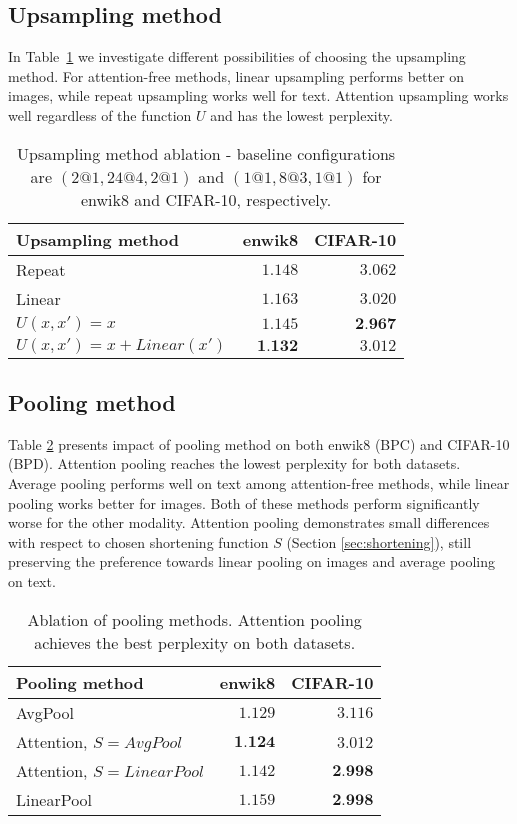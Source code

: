 \documentclass[11pt]{article}
\begin{document}
\subsection{Upsampling method}\label{sec:upsampling}
In Table~\ref{tab:upsampling} we investigate different possibilities of choosing the upsampling method. For attention-free methods, linear upsampling performs better on images, while repeat upsampling works well for text. Attention upsampling works well regardless of the function $U$ and has the lowest perplexity.

\begin{table}[ht!]
\small
\centering
\setlength{\tabcolsep}{0.9em}
\begin{tabular}{lrr}
\hline
Upsampling method & enwik8 & CIFAR-10 \\
\hline
Repeat & $1.148$ & $3.062$ \\ 
\hline
Linear & $1.163$ & $3.020$  \\
$U(x, x') = x$ & $1.145$ & $\textbf{2.967}$ \\
$U(x, x') = x + Linear(x')$ &  $\textbf{1.132}$ & $3.012$ \\
\hline
\end{tabular}
\caption{Upsampling method ablation - baseline configurations are $(2@1, 24@4, 2@1)$ and $(1@1, 8@3, 1@1)$ for enwik8 and CIFAR-10, respectively. }
\label{tab:upsampling}
\end{table}

\vspace{-5mm}
\subsection{Pooling method}\label{sec:pooling}
Table \ref{tab:pooling} presents impact of pooling method on both enwik8 (BPC) and CIFAR-10 (BPD). Attention pooling reaches the lowest perplexity for both datasets. Average pooling performs well on text among attention-free methods, while linear pooling works better for images. Both of these methods perform significantly worse for the other modality. Attention pooling demonstrates small differences with respect to chosen shortening function $S$ (Section \ref{sec:shortening}), still preserving the preference towards linear pooling on images and average pooling on text.

\begin{table}[ht!]
\small
\centering
\setlength{\tabcolsep}{0.9em}
\begin{tabular}{lrr}
\hline
Pooling method & enwik8 & CIFAR-10\\
\hline
AvgPool & $1.129$ & $3.116$\\
\hline
Attention, $S = AvgPool$ & $\textbf{1.124}$ & 3.012 \\
Attention, $S = LinearPool$  & $1.142$ & $\textbf{2.998}$ \\
LinearPool & $1.159$ & $\textbf{2.998}$ \\
\hline
\end{tabular}
\caption{Ablation of pooling methods. Attention pooling achieves the best perplexity on both datasets.}
\label{tab:pooling}
\end{table}
\end{document}
